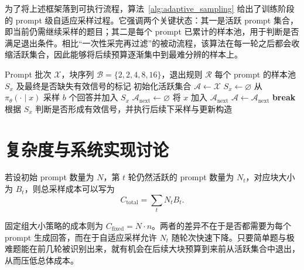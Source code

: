 为了将上述框架落到可执行流程，算法~\ref{alg:adaptive_sampling} 给出了训练阶段的 prompt 级自适应采样过程。它强调两个关键状态：其一是活跃 prompt 集合，即当前仍需继续采样的题目；其二是每个 prompt 已累计的样本池，用于判断是否满足退出条件。相比“一次性采完再过滤”的被动流程，该算法在每一轮之后都会收缩活跃集合，因此能够将后续预算逐渐集中到最难分辨的样本上。

\begin{algorithm}[!htbp]
    \caption{几何块自适应采样流程}
    \label{alg:adaptive_sampling}
    \small
    \begin{algorithmic}[1]
        \Require Prompt 批次 $\mathcal{X}$，块序列 $\mathcal{B}=\{2,2,4,8,16\}$，退出规则 $\mathcal{R}$
        \Ensure 每个 prompt 的样本池 $S_x$ 及最终是否缺失有效信号的标记
        \State 初始化活跃集合 $\mathcal{A}\leftarrow \mathcal{X}$
            \State $S_x\leftarrow \varnothing$
        \EndFor
                \State 从 $\pi_{\theta}(\cdot\mid x)$ 采样 $b$ 个回答并加入 $S_x$
            \EndFor
            \State $\mathcal{A}_{\mathrm{next}}\leftarrow \varnothing$
                    \State 将 $x$ 加入 $\mathcal{A}_{\mathrm{next}}$
                \EndIf
            \EndFor
            \State $\mathcal{A}\leftarrow \mathcal{A}_{\mathrm{next}}$
                \State \textbf{break}
            \EndIf
        \EndFor
            \State 根据 $S_x$ 判断是否形成有效信号，并执行后续下采样与更新构造
        \EndFor
    \end{algorithmic}
\end{algorithm}

\section{复杂度与系统实现讨论}

若设初始 prompt 数量为 $N$，第 $t$ 轮仍然活跃的 prompt 数量为 $N_t$，对应块大小为 $B_t$，则总采样成本可以写为
\begin{equation}
    C_{\mathrm{total}}=\sum_t N_t B_t.
\end{equation}

固定组大小策略的成本则为 $C_{\mathrm{fixed}}=N\cdot n$。两者的差异不在于是否都需要为每个 prompt 生成回答，而在于自适应采样允许 $N_t$ 随轮次快速下降。只要简单题与极难题能在前几轮被识别出来，就有机会在后续大块预算到来前从活跃集合中退出，从而压低总体成本。

